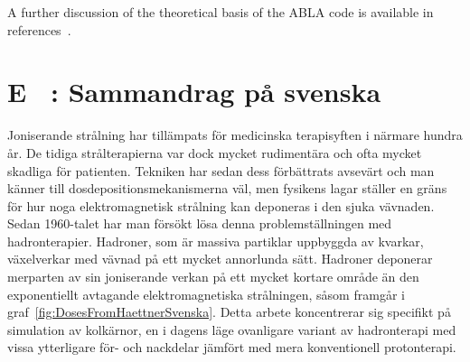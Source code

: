 A further discussion of the theoretical basis of the ABLA code is available in references~\cite{ablatalk,iia}.

\clearpage
{}
\renewcommand{\theequation}{E\arabic{equation}}
\setcounter{equation}{0}  
\renewcommand{\thefigure}{E\arabic{figure}}
\setcounter{figure}{0}
\renewcommand{\thetable}{E\arabic{table}}
\setcounter{table}{0}
\renewcommand{\thesection}{E}
\setcounter{section}{1}
\setcounter{subsection}{0}

\section*{\label{sammandragpasvenska}E ~: Sammandrag på svenska}
Joniserande strålning har tillämpats för medicinska terapisyften i närmare hundra år. De tidiga strålterapierna var dock mycket rudimentära och ofta mycket skadliga för patienten. Tekniken har sedan dess förbättrats avsevärt och man känner till dosdepositionsmekanismerna väl, men fysikens lagar ställer en gräns för hur noga elektromagnetisk strålning kan deponeras i den sjuka vävnaden. Sedan 1960-talet har man försökt lösa denna problemställningen med hadronterapier. Hadroner, som är massiva partiklar uppbyggda av kvarkar, växelverkar med vävnad på ett mycket annorlunda sätt. Hadroner deponerar merparten av sin joniserande verkan på ett mycket kortare område än den exponentiellt avtagande elektromagnetiska strålningen, såsom framgår i graf~\ref{fig:DosesFromHaettnerSvenska}. Detta arbete koncentrerar sig specifikt på simulation av kolkärnor, en i dagens läge ovanligare variant av hadronterapi med vissa ytterligare för- och nackdelar jämfört med mera konventionell protonterapi.

